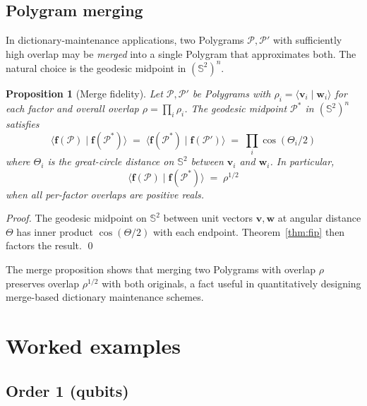 \documentclass[11pt,letterpaper]{article}
\newtheorem{proposition}[theorem]{Proposition}
\theoremstyle{definition}
\newcommand{\Sphere}{\mathbb{S}}
\newcommand{\Polygram}{\mathcal{P}}
\newcommand{\inner}[2]{\langle #1 \mid #2 \rangle}
\begin{document}
\subsection{Polygram merging}

In dictionary-maintenance applications, two Polygrams $\Polygram, \Polygram'$
with sufficiently high overlap may be \emph{merged} into a single Polygram
that approximates both. The natural choice is the geodesic midpoint in
$(\Sphere^{2})^{n}$.

\begin{proposition}[Merge fidelity]
\label{prop:merge}
Let $\Polygram, \Polygram'$ be Polygrams with $\rho_{i} =
\inner{\bm{v}_{i}}{\bm{w}_{i}}$ for each factor and overall overlap
$\rho = \prod_{i} \rho_{i}$. The geodesic midpoint $\Polygram^{*}$ in
$(\Sphere^{2})^{n}$ satisfies
\[
\inner{\bm{f}(\Polygram)}{\bm{f}(\Polygram^{*})}
   \;=\; \inner{\bm{f}(\Polygram^{*})}{\bm{f}(\Polygram')}
   \;=\; \prod_{i} \cos(\Theta_{i}/2)
\]
where $\Theta_{i}$ is the great-circle distance on $\Sphere^{2}$ between
$\bm{v}_{i}$ and $\bm{w}_{i}$. In particular,
\[
\inner{\bm{f}(\Polygram)}{\bm{f}(\Polygram^{*})} \;=\;
   \rho^{1/2}
\]
when all per-factor overlaps are positive reals.
\end{proposition}
\begin{proof}
The geodesic midpoint on $\Sphere^{2}$ between unit vectors $\bm{v}, \bm{w}$
at angular distance $\Theta$ has inner product $\cos(\Theta/2)$ with each
endpoint. Theorem~\ref{thm:fip} then factors the result. \qed
\end{proof}

The merge proposition shows that merging two Polygrams with overlap $\rho$
preserves overlap $\rho^{1/2}$ with both originals, a fact useful in
quantitatively designing merge-based dictionary maintenance schemes.

\section{Worked examples}
\label{sec:examples}

\subsection{Order 1 (qubits)}
\end{document}

